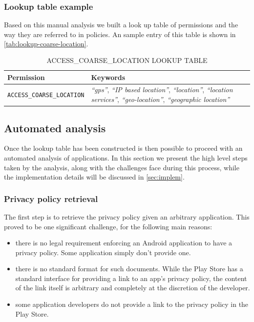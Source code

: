 \documentclass[twoside,letterpaper]{soups}
\theoremstyle{definition}
\begin{document}
\subsubsection{Lookup table example}
Based on this manual analysis we built a look up table of permissions and the way they are referred to in policies. An sample entry of this table is shown in \autoref{tab:lookup-coarse-location}.

\begin{table}[ht]
    \caption{ACCESS\_COARSE\_LOCATION LOOKUP TABLE}
    \label{tab:lookup-coarse-location}
    \centering
    \begin{tabular}{lp{4cm}}
        \toprule
            Permission   & Keywords \\
            \midrule
                \texttt{ACCESS\_COARSE\_LOCATION}  & \emph{``gps''}, \emph{``IP based location''}, \emph{``location''}, \emph{``location services''}, \emph{``geo-location''}, \emph{``geographic location''} \\
        \bottomrule
    \end{tabular}
\end{table}

\subsection{Automated analysis}
\label{sec:automated-analysis}
Once the lookup table has been constructed is then possible to proceed with an automated analysis of applications.
In this section we present the high level steps taken by the analysis, along with the challenges face during this process, while the implementation details will be discussed in \autoref{sec:implem}.

\subsubsection{Privacy policy retrieval}
The first step is to retrieve the privacy policy given an arbitrary application. This proved to be one significant challenge, for the following main reasons:
\begin{itemize}
    \item there is no legal requirement enforcing an Android application to have a privacy policy. Some application simply don't provide one.
    \item there is no standard format for such documents. While the Play Store has a standard interface for providing a link to an app's privacy policy, the content of the link itself is arbitrary and completely at the discretion of the developer.
    \item some application developers do not provide a link to the privacy policy in the Play Store.
\end{itemize}
\end{document}
